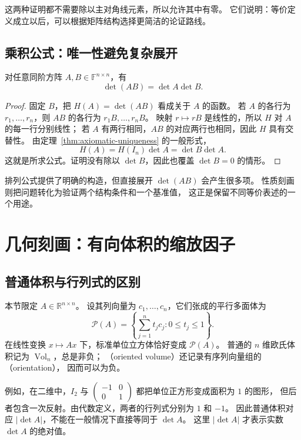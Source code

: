 \documentclass[UTF8,12pt,a4paper,fontset=fandol]{ctexart}
\begin{document}
这两种证明都不需要除以主对角线元素，所以允许其中有零。
它们说明：等价定义成立以后，可以根据矩阵结构选择更简洁的论证路线。

\subsection{乘积公式：唯一性避免复杂展开}

\begin{theorem}[行列式的乘积公式]
\label{thm:multiplicativity}
对任意同阶方阵 $A,B\in\mathbb F^{n\times n}$，有
\begin{equation}
  \det(AB)=\det A\det B.
  \label{eq:multiplicativity}
\end{equation}
\end{theorem}

\begin{proof}
固定 $B$，把 $H(A)=\det(AB)$ 看成关于 $A$ 的函数。
若 $A$ 的各行为 $r_1,\ldots,r_n$，则 $AB$ 的各行为 $r_1B,\ldots,r_nB$。
映射 $r\mapsto rB$ 是线性的，所以 $H$ 对 $A$ 的每一行分别线性；
若 $A$ 有两行相同，$AB$ 的对应两行也相同，因此 $H$ 具有交替性。
由定理~\ref{thm:axiomatic-uniqueness} 的一般形式，
\[
  H(A)=H(I_n)\det A=\det B\det A.
\]
这就是所求公式。证明没有除以 $\det B$，因此也覆盖 $\det B=0$ 的情形。
\end{proof}

排列公式提供了明确的构造，但直接展开 $\det(AB)$ 会产生很多项。
性质刻画则把问题转化为验证两个结构条件和一个基准值，
这正是保留不同等价表述的一个用途。

\section{几何刻画：有向体积的缩放因子}
\label{sec:geometry}

\subsection{普通体积与行列式的区别}

本节限定 $A\in\mathbb R^{n\times n}$。
设其列向量为 $c_1,\ldots,c_n$，它们张成的平行多面体为
\[
  \mathcal P(A)
  =\left\{\sum_{j=1}^{n}t_jc_j:0\leq t_j\leq1\right\}.
\]
在线性变换 $x\mapsto Ax$ 下，标准单位立方体恰好变成 $\mathcal P(A)$。
普通的 $n$ 维欧氏体积记为 $\operatorname{Vol}_n$，总是非负；
（oriented volume）还记录有序列向量组的（orientation），
因而可以为负。

例如，在二维中，$I_2$ 与 $\begin{pmatrix}-1&0\\0&1\end{pmatrix}$
都把单位正方形变成面积为 $1$ 的图形，
但后者包含一次反射。由代数定义，两者的行列式分别为 $1$ 和 $-1$。
因此普通体积对应 $|\det A|$，不能在一般情况下直接等同于 $\det A$。
这里 $|\det A|$ 才表示实数 $\det A$ 的绝对值。
\end{document}
